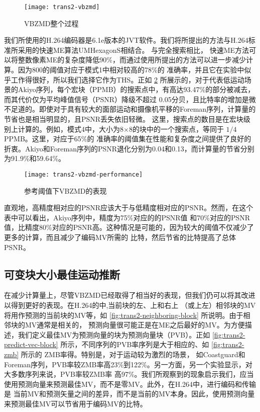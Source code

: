 \begin{figure}[H] %
  \centering
  \texttt{[image: trans2-vbzmd]}
  \caption{VBZMD整个过程}
  \label{fig:trans2-vbzmd}
\end{figure}

我们所使用的H.264编码器是6.1e版本的JVT软件。我们将所提出的方法与H.264标准所采用的快速ME算法UMHexagonS相结合。 与完全搜索相比，
快速ME方法可以将整数像素ME的复杂度降低90\%，而通过使用所提出的方法可以进一步减少计算。因为800的阈值对应于模式1中相对较高的78\%的
准确率，并且它在实验中似乎工作得很好，所以我们选择它作为THS。正如 \ref{fig:trans2-vbzmd-performance} 所展示的，对于代表低运动场景的Akiyo序列，每个宏块（PPMB）的搜索点中，有高达93.47\%的部分被减去，而其代价仅为平均峰值信号（PSNR）降级不超过
0.05分贝，且比特率的增加是微不足道的。即使对于具有较大的面部运动和摄像机平移的Foreman序列，计算量的节省也是相当明显的，且PSNR丢失依旧轻微。
这里，搜索点的数目是在宏块级别上计算的。例如，模式4中，大小为8×8的块中的一个搜索点，等同于 $1/4$ PPMB。这里，对应于65\%的
准确率的阈值集在性能和复杂度之间提供了良好的折衷。Akiyo和Foreman序列的PSNR退化分别为0.04和0.13，而计算量的节省分别为91.9\%和59.64\%。

\begin{figure}[H] %
  \centering
  \texttt{[image: trans2-vbzmd-performance]}
  \caption{参考阈值下VBZMD的表现}
  \label{fig:trans2-vbzmd-performance}
\end{figure}

直观地，高精度相对应的PSNR应该大于与低精度相对应的PSNR。然而，在这个表中可以看出，Akiyo序列中，精度为75\%对应的的PSNR值
和70\%对应的PSNR值，比精度80\%对应的PSNR高。这种情况是可能的，因为较大的阈值不仅减少了更多的计算，而且减少了编码MV所需的
比特，然后节省的比特提高了总体PSNR。

\subsection{可变块大小最佳运动推断}
\label{sec:vbbmd}

在减少计算量上，尽管VBZMD已经取得了相当好的表现，但我们仍可以将其改进以得到更好的表现。在H.264的中,当前块的左、上和右上
（或上左）相邻块的MV将用作预测的当前块的MV等，如 \ref{fig:trans2-neighboring-block} 所说明。由于相邻块的MV通常是相关的，
预测向量很可能正是在ME之后最好的MV。为方便描述，我们定义最佳MV为预测向量的块为预测向量块（PVB）。正如 \ref{fig:trans2-predict-vec-block} 所示，不同序列的PVB率序列是大于相应的、如 \ref{fig:trans2-zmb} 所示的 ZMB率得。特别是，对于运动较为激烈的场景，
如Coastguard和Foreman序列，PVB率较ZMB率高23\%到122\%。另一方面，另一个实验显示，对大多数序列来说，PVB率较ZMB率
高97\%。我们所观察到的现象启示我们，应当使用预测向量来预测最佳MV，而不是零MV。此外，在H.264中，进行编码和传输是
当前MV和预测矢量之间的差异，而不是当前的MV本身。因此，使用预测向量来预测最佳MV可以节省用于编码MV的比特。

